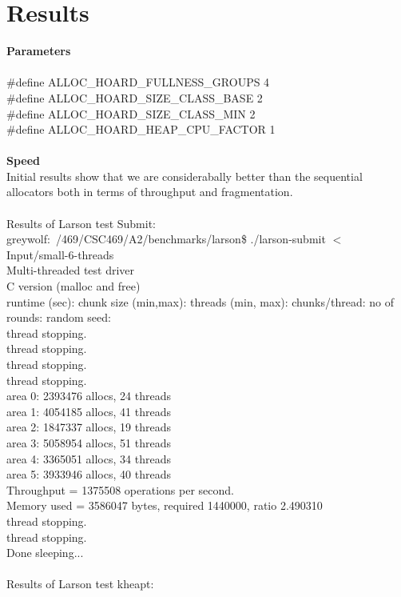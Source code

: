 \documentclass{article}
\begin{document}
\newpage
\noindent
\section{Results}
\textbf{Parameters}
\\
\\
\#define ALLOC\_HOARD\_FULLNESS\_GROUPS 4
\\
\#define ALLOC\_HOARD\_SIZE\_CLASS\_BASE 2
\\
\#define ALLOC\_HOARD\_SIZE\_CLASS\_MIN 2
\\
\#define ALLOC\_HOARD\_HEAP\_CPU\_FACTOR 1
\\
\\
\textbf{Speed}
\\
\indent Initial results show that we are considerabally better than the sequential allocators both in terms of throughput and fragmentation.
\\
\\
Results of Larson test Submit:
\\
greywolf:~/469/CSC469/A2/benchmarks/larson\$  ./larson-submit $<$ Input/small-6-threads
\\
Multi-threaded test driver 
\\
C version (malloc and free)
\\
runtime (sec): chunk size (min,max): threads (min, max):   chunks/thread:  no of rounds:   random seed:    
\\
thread stopping.
\\
thread stopping.
\\
thread stopping.
\\
thread stopping.
\\
area 0: 2393476 allocs, 24 threads
\\
area 1: 4054185 allocs, 41 threads
\\
area 2: 1847337 allocs, 19 threads
\\
area 3: 5058954 allocs, 51 threads
\\
area 4: 3365051 allocs, 34 threads
\\
area 5: 3933946 allocs, 40 threads
\\
Throughput =  1375508 operations per second.
\\
Memory used = 3586047 bytes, required 1440000, ratio 2.490310
\\
thread stopping.
\\
thread stopping.
\\
Done sleeping...
\\
\\
Results of Larson test kheapt:
\end{document}

